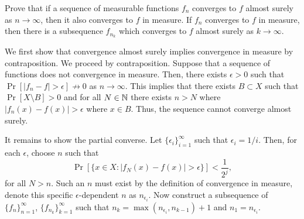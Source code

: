 \begin{problem}{7}
\end{problem}
\begin{solution}
     
\end{solution}

\begin{problem}{8}
Prove that if a sequence of measurable functions $f_n$ converges to $f$ almost surely as $n\to\infty$, then it also converges to $f$ in measure. If $f_n$ converges to $f$ in measure, then there is a subsequence $f_{n_k}$ which converges to $f$ almost surely as $k\to\infty$.
\end{problem}
\begin{solution}
    We first show that convergence almost surely implies convergence in measure by contraposition. We proceed by contraposition. Suppose that a sequence of functions does not convergence in measure. Then, there exists $\epsilon > 0$ such that $\Pr[|f_n - f| > \epsilon] \not \to 0$ as $n\to \infty$. This implies that there exists $B \subset X$ such that $\Pr[X \setminus B] > 0$ and for all $N \in \mathbb{N}$ there exists $n > N$ where $|f_n(x) - f(x)| > \epsilon$ where $x \in B$. Thus, the sequence cannot converge almost surely. 

    It remains to show the partial converse. Let $\{\epsilon_i\}_{i=1}^\infty$ such that $\epsilon_i = 1/i$. Then, for each $\epsilon$, choose $n$ such that \[
        \Pr[\{x \in X: |f_N(x) - f(x)| > \epsilon\}] < \frac{1}{2^j},
    \]
    for all $N > n$. Such an $n$ must exist by the definition of convergence in measure, denote this specific $\epsilon$-dependent $n$ as $n_{\epsilon_i}$. Now construct a subsequence of $\{f_n\}_{n=1}^\infty$, $\{f_{n_k}\}_{k=1}^\infty$ such that $n_k = \max (n_{\epsilon_i}, n_{k-1})+1$ and $n_1 = n_{\epsilon_i}$.


\end{solution}
